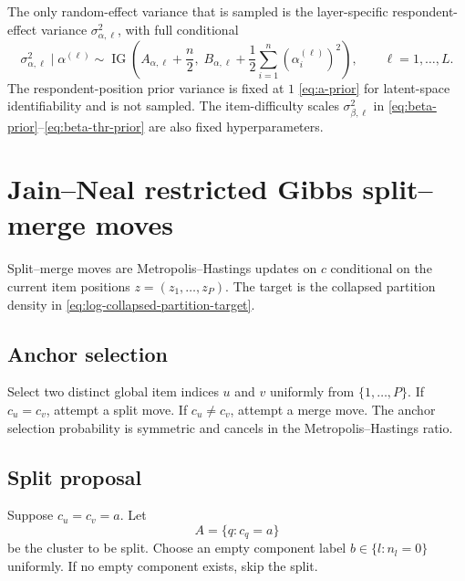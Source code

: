 \documentclass[11pt]{article}
\DeclareMathOperator{\IG}{IG}
\begin{document}
The only random-effect variance that is sampled is the layer-specific
respondent-effect variance $\sigma_{\alpha,\ell}^2$, with full conditional
\begin{equation}
    \sigma_{\alpha,\ell}^2\mid \alpha^{(\ell)}
    \sim
    \IG\left(
    A_{\alpha,\ell}+\frac{n}{2},\;
    B_{\alpha,\ell}+\frac{1}{2}\sum_{i=1}^{n}(\alpha_i^{(\ell)})^2
    \right),
    \qquad \ell=1,\dots,L.
    \label{eq:sigma-alpha-update}
\end{equation}
The respondent-position prior variance is fixed at $1$ \eqref{eq:a-prior} for
latent-space identifiability and is not sampled.  The item-difficulty scales
$\sigma_{\beta,\ell}^2$ in \eqref{eq:beta-prior}--\eqref{eq:beta-thr-prior}
are also fixed hyperparameters.

\section{Jain--Neal restricted Gibbs split--merge moves}

Split--merge moves are Metropolis--Hastings updates on $c$ conditional on the
current item positions $z=(z_1,\dots,z_P)$.  The target is the collapsed
partition density in \eqref{eq:log-collapsed-partition-target}.

\subsection{Anchor selection}

Select two distinct global item indices $u$ and $v$ uniformly from
$\{1,\dots,P\}$.  If $c_u=c_v$, attempt a split move.  If $c_u\neq c_v$,
attempt a merge move.  The anchor selection probability is symmetric and
cancels in the Metropolis--Hastings ratio.

\subsection{Split proposal}

Suppose $c_u=c_v=a$.  Let
\[
    A=\{q:c_q=a\}
\]
be the cluster to be split.  Choose an empty component label
$b\in\{l:n_l=0\}$ uniformly.  If no empty component exists, skip the split.
\end{document}
